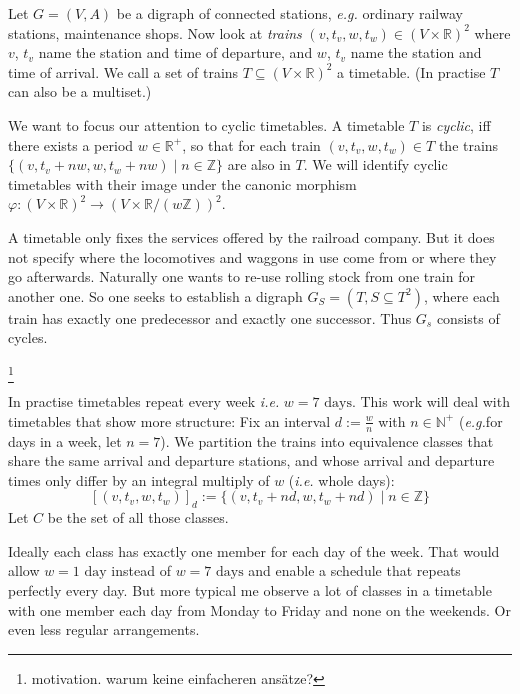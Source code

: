 \documentclass[a4paper]{amsart} %
\def\ie{\emph{i.e.}}
\def\eg{\emph{e.g.}}
\newcommand{\todo}[1]{\footnote{#1}}
\begin{document}
Let \(G=(V,A)\) be a digraph of connected stations, \eg{} ordinary
railway stations, maintenance shops.  Now look at \label{trains}
\textit{trains} \((v, t_v, w, t_w) \in \left(V \times \mathbb{R}\right)^2 \)
where \(v\), \(t_v\) name the station and time of departure, and
\(w\), \(t_v\) name the station and time of arrival.  We call a set of
trains \(T \subseteq \left(V \times \mathbb{R}\right)^2\) a timetable.  (In
practise \(T\) can also be a multiset.)

We want to focus our attention to cyclic timetables.  A timetable \(T\)
is \label{cyclic} \textit{cyclic}, iff there exists a period \(w \in
\mathbb{R}^+\), so that for each train \((v, t_v, w, t_w) \in T\)
the trains \(\{(v, t_v+n w, w, t_w +n w) \mid n \in \mathbb{Z}\}\)
are also in \(T\).  We will identify cyclic timetables with their
image under the canonic morphism
\(\varphi \colon \left(V \times \mathbb{R}\right)^2
\to \left(V \times \mathbb{R}/{\left(w \mathbb{Z}\right)}\right)^2\).

A timetable only fixes the services offered by the railroad company.
But it does not specify where the locomotives and waggons in use come
from or where they go afterwards.  Naturally one wants to re-use
rolling stock from one train for another one.  So one seeks to
establish a digraph \(G_S=(T,S\subseteq T^2)\), where each train has
exactly one predecessor and exactly one successor.  Thus \(G_s\)
consists of cycles.

\todo{motivation.  warum keine einfacheren ansätze?}

In practise timetables repeat every week \ie{} \(w = 7 \textrm{ days}\).
This work will deal with timetables that show more structure: Fix an
interval \(d := \frac{w}{n}\) with \(n \in \mathbb{N}^+\) (\eg for
days in a week, let \(n=7\)).  We partition the trains into
equivalence classes that share the same arrival and departure
stations, and whose arrival and departure times only differ by an
integral multiply of \(w\) (\ie{} whole days):
\begin{equation}
  \left[\left( v, t_v, w, t_w \right) \right]_d := \{(v, t_v+n d, w, t_w +n d) \mid n \in \mathbb{Z}\}
\end{equation}
Let \(C\) be the set of all those classes.

Ideally each class has exactly one member for each day of the week.
That would allow \(w = 1 \textrm{ day}\) instead of \(w = 7 \textrm{ days}\)
and enable a schedule that repeats perfectly every day.  But more
typical me observe a lot of classes in a timetable with one member
each day from Monday to Friday and none on the weekends.  Or even less
regular arrangements.
\end{document}
